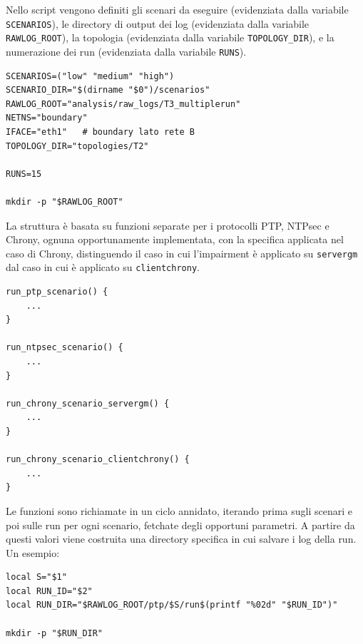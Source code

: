 Nello script vengono definiti gli scenari da eseguire (evidenziata dalla variabile
\texttt{SCENARIOS}), le directory di output dei log (evidenziata dalla variabile \texttt{RAWLOG\_ROOT}),
la topologia (evidenziata dalla variabile \texttt{TOPOLOGY\_DIR}), e la
numerazione dei run (evidenziata dalla variabile \texttt{RUNS}).

\begin{listing}[H]
\begin{verbatim}
SCENARIOS=("low" "medium" "high")
SCENARIO_DIR="$(dirname "$0")/scenarios"
RAWLOG_ROOT="analysis/raw_logs/T3_multiplerun"
NETNS="boundary"
IFACE="eth1"   # boundary lato rete B
TOPOLOGY_DIR="topologies/T2"

RUNS=15

mkdir -p "$RAWLOG_ROOT"
\end{verbatim}
\caption{Variabili globali dello script di automazione.}
\label{lst:auto-vars}
\end{listing}

La struttura è basata su funzioni separate per i protocolli PTP, NTPsec e Chrony,
ognuna opportunamente implementata, con la specifica applicata nel caso di Chrony,
distinguendo il caso in cui l'impairment è applicato su \texttt{servergm} dal caso
in cui è applicato su \texttt{clientchrony}.

\begin{listing}[H]
\begin{verbatim}
run_ptp_scenario() {
    ...
}

run_ntpsec_scenario() {
    ...
}

run_chrony_scenario_servergm() {
    ...
}

run_chrony_scenario_clientchrony() {
    ...
}
\end{verbatim}
\caption{Funzioni principali dello script di automazione.}
\label{lst:auto-functions}
\end{listing}

Le funzioni sono richiamate in un ciclo annidato, iterando prima sugli scenari e
poi sulle run per ogni scenario, fetchate degli opportuni parametri. A partire
da questi valori viene costruita una directory specifica in cui salvare i log
della run. Un esempio:

\begin{listing}[H]
\begin{verbatim}
local S="$1"
local RUN_ID="$2"
local RUN_DIR="$RAWLOG_ROOT/ptp/$S/run$(printf "%02d" "$RUN_ID")"

mkdir -p "$RUN_DIR"
\end{verbatim}
\caption{Creazione della directory di output per una run PTP.}
\label{lst:auto-run-dir-ptp}
\end{listing}

